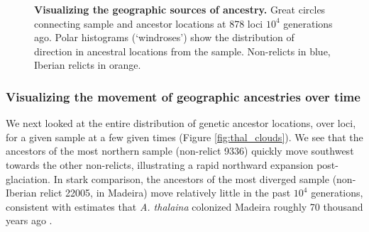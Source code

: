 \documentclass[12pt]{article}
\begin{document}
\begin{figure}[!htb]
\begin{center}

\end{center}

\caption{
\textbf{Visualizing the geographic sources of ancestry.}
Great circles connecting sample and ancestor locations at 878 loci $10^4$ generations ago. Polar histograms (`windroses') show the distribution of direction in ancestral locations from the sample. Non-relicts in blue, Iberian relicts in orange.
}

\label{fig:thal_windrose}
\end{figure}

\subsubsection*{Visualizing the movement of geographic ancestries over time}

We next looked at the entire distribution of genetic ancestor locations, over loci, for a given sample at a few given times (Figure \ref{fig:thal_clouds}). We see that the ancestors of the most northern sample (non-relict 9336) quickly move southwest towards the other non-relicts, illustrating a rapid northward expansion post-glaciation. In stark comparison, the ancestors of the most diverged sample (non-Iberian relict 22005, in Madeira) move relatively little in the past $10^4$ generations, consistent with estimates that \textit{A. thalaina} colonized Madeira roughly 70 thousand years ago \citep{fulgione2018madeiran}.
\end{document}
